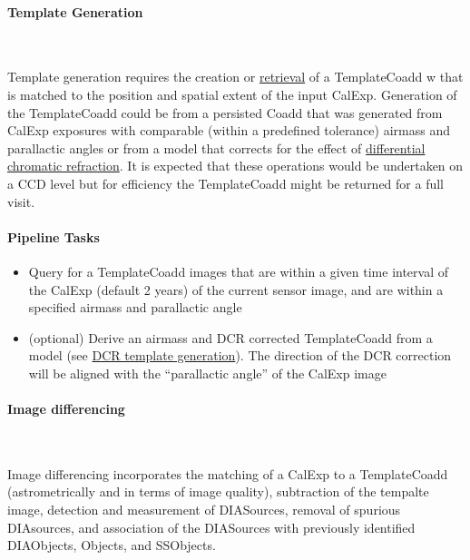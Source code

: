 \paragraph{Template Generation}~

Template generation requires the creation or \hyperref[sec:acRetrieveTemplate]{retrieval} of a TemplateCoadd w that is matched to the position and spatial extent of the input CalExp. Generation of the TemplateCoadd could be from a persisted Coadd that was generated from CalExp exposures with comparable (within a predefined tolerance) airmass and parallactic angles or from a model that corrects for the effect of  \hyperref[sec:acDCRTemplates]{differential chromatic refraction}. It is expected that these operations would be undertaken on a CCD level but for efficiency the TemplateCoadd might be returned for a full visit. 


\paragraph{Pipeline Tasks}
\begin{itemize}
\item Query for a TemplateCoadd images that are within a given time interval of the CalExp  (default 2 years) of the current sensor image, and are within a specified airmass and parallactic angle
\item (optional) Derive an airmass and DCR corrected TemplateCoadd from a model (see  \hyperref[sec:acDCRTemplates]{ DCR template generation}). The direction of the DCR correction will be aligned with the 
  ``parallactic angle'' of the CalExp image
\end{itemize}

\paragraph{Image differencing}~

Image differencing incorporates the matching of a CalExp to a TemplateCoadd (astrometrically and in terms of image quality), subtraction of the tempalte image, detection and measurement of DIASources, removal of spurious DIAsources, and association of the DIASources with previously identified DIAObjects, Objects, and SSObjects. 

